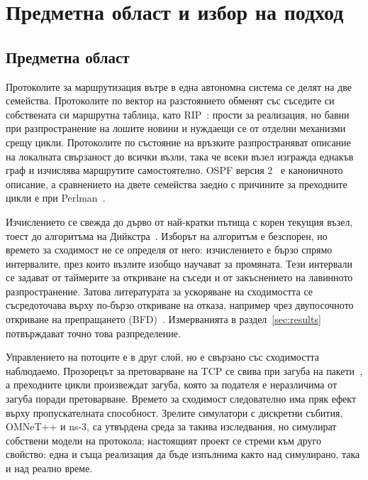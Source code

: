 \section{Предметна област и избор на подход}
\label{sec:literature}

\subsection{Предметна област}

Протоколите за маршрутизация вътре в една автономна система се делят на две семейства.
Протоколите по вектор на разстоянието обменят със съседите си собствената си маршрутна
таблица, като RIP~\cite{rfc1058}: прости за реализация, но бавни при разпространение на
лошите новини и нуждаещи се от отделни механизми срещу цикли. Протоколите по състояние на
връзките разпространяват описание на локалната свързаност до всички възли, така че всеки възел
изгражда еднакъв граф и изчислява маршрутите самостоятелно. OSPF версия 2~\cite{rfc2328} е
каноничното описание, а сравнението на двете семейства заедно с причините за преходните цикли
е при Perlman~\cite{perlman2000}.

Изчислението се свежда до дърво от най-кратки пътища с корен текущия възел, тоест до
алгоритъма на Дийкстра~\cite{dijkstra1959}. Изборът на алгоритъм е безспорен, но времето за
сходимост не се определя от него: изчислението е бързо спрямо интервалите, през които възлите
изобщо научават за промяната. Тези интервали се задават от таймерите за откриване на съседи и
от закъснението на лавинното разпространение. Затова литературата за ускоряване на сходимостта
се съсредоточава върху по-бързо откриване на отказа, например чрез двупосочното откриване на
препращането (BFD)~\cite{rfc5880}. Измерванията в раздел~\ref{sec:results} потвърждават точно
това разпределение.

Управлението на потоците е в друг слой, но е свързано със сходимостта наблюдаемо. Прозорецът
за претоварване на TCP се свива при загуба на пакети~\cite{jacobson1988,rfc5681}, а преходните
цикли произвеждат загуба, която за подателя е неразличима от загуба поради претоварване.
Времето за сходимост следователно има пряк ефект върху пропускателната способност. Зрелите
симулатори с дискретни събития, OMNeT++ и ns-3, са утвърдена среда за такива изследвания, но
симулират собствени модели на протокола; настоящият проект се стреми към друго свойство: една
и съща реализация да бъде изпълнима както над симулирано, така и над реално време.

